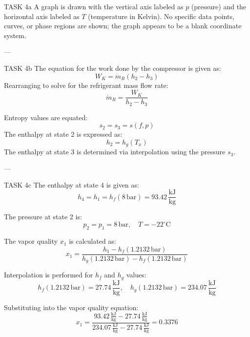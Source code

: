 TASK 4a  
A graph is drawn with the vertical axis labeled as \( p \) (pressure) and the horizontal axis labeled as \( T \) (temperature in Kelvin). No specific data points, curves, or phase regions are shown; the graph appears to be a blank coordinate system.

---

TASK 4b  
The equation for the work done by the compressor is given as:  
\[
W_K = \dot{m}_R (h_2 - h_3)
\]  
Rearranging to solve for the refrigerant mass flow rate:  
\[
\dot{m}_R = \frac{W_K}{h_2 - h_3}
\]  

Entropy values are equated:  
\[
s_2 = s_3 = s(f, p)
\]  
The enthalpy at state 2 is expressed as:  
\[
h_2 = h_g(T_x)
\]  
The enthalpy at state 3 is determined via interpolation using the pressure \( s_3 \).

---

TASK 4c  
The enthalpy at state 4 is given as:  
\[
h_4 = h_1 = h_f(8 \, \text{bar}) = 93.42 \, \frac{\text{kJ}}{\text{kg}}
\]  

The pressure at state 2 is:  
\[
p_2 = p_1 = 8 \, \text{bar}, \quad T = -22^\circ\text{C}
\]  

The vapor quality \( x_1 \) is calculated as:  
\[
x_1 = \frac{h_1 - h_f(1.2132 \, \text{bar})}{h_g(1.2132 \, \text{bar}) - h_f(1.2132 \, \text{bar})}
\]  

Interpolation is performed for \( h_f \) and \( h_g \) values:  
\[
h_f(1.2132 \, \text{bar}) = 27.74 \, \frac{\text{kJ}}{\text{kg}}, \quad h_g(1.2132 \, \text{bar}) = 234.07 \, \frac{\text{kJ}}{\text{kg}}
\]  

Substituting into the vapor quality equation:  
\[
x_1 = \frac{93.42 \, \frac{\text{kJ}}{\text{kg}} - 27.74 \, \frac{\text{kJ}}{\text{kg}}}{234.07 \, \frac{\text{kJ}}{\text{kg}} - 27.74 \, \frac{\text{kJ}}{\text{kg}}} = 0.3376
\]